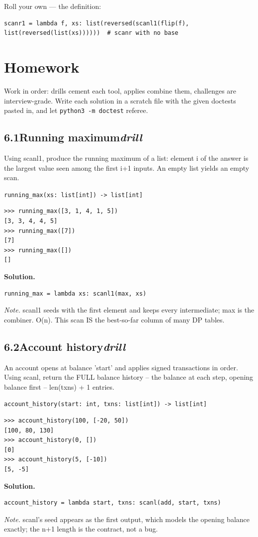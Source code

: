 \documentclass[10pt,letterpaper]{book}
\begin{document}
Roll your own --- the definition:

\begin{lstlisting}[style=ex]
scanr1 = lambda f, xs: list(reversed(scanl1(flip(f), list(reversed(list(xs))))))  # scanr with no base
\end{lstlisting}

\section{Homework}
Work in order: drills cement each tool, applies combine them,
challenges are interview-grade. Write each solution in a scratch file with
the given doctests pasted in, and let \texttt{python3 -m doctest} referee.
\subsection*{6.1\quad Running maximum\hfill\textnormal{\textit{drill}}}
Using scanl1, produce the running maximum of a list: element i of the answer is the largest value seen among the first i+1 inputs. An empty list yields an empty scan.

\noindent\texttt{running\_max(xs: list[int]) -> list[int]}
\begin{lstlisting}[style=ex]
>>> running_max([3, 1, 4, 1, 5])
[3, 3, 4, 4, 5]
>>> running_max([7])
[7]
>>> running_max([])
[]
\end{lstlisting}
\noindent\textbf{Solution.}
\begin{lstlisting}[style=code]
running_max = lambda xs: scanl1(max, xs)
\end{lstlisting}
\noindent\textit{Note.} scanl1 seeds with the first element and keeps every intermediate; max is the combiner. O(n). This scan IS the best-so-far column of many DP tables.

\subsection*{6.2\quad Account history\hfill\textnormal{\textit{drill}}}
An account opens at balance 'start' and applies signed transactions in order. Using scanl, return the FULL balance history -- the balance at each step, opening balance first -- len(txns) + 1 entries.

\noindent\texttt{account\_history(start: int, txns: list[int]) -> list[int]}
\begin{lstlisting}[style=ex]
>>> account_history(100, [-20, 50])
[100, 80, 130]
>>> account_history(0, [])
[0]
>>> account_history(5, [-10])
[5, -5]
\end{lstlisting}
\noindent\textbf{Solution.}
\begin{lstlisting}[style=code]
account_history = lambda start, txns: scanl(add, start, txns)
\end{lstlisting}
\noindent\textit{Note.} scanl's seed appears as the first output, which models the opening balance exactly; the n+1 length is the contract, not a bug.
\end{document}
